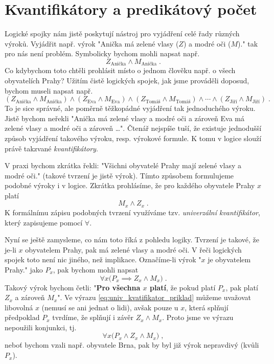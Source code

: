 \section{Kvantifikátory a predikátový počet}\label{sec:kvantifikatory_a_pred_pocet}

Logické spojky nám jistě poskytují nástroj pro vyjádření celé řady různých výroků. Vyjádřit např. výrok "Anička má zelené vlasy ($Z$) a modré oči ($M$)." tak pro nás není problém. Symbolicky bychom mohli napsat např.
\begin{equation*}
    Z_{\text{Anička}} \land M_{\text{Anička}}\; .
\end{equation*}
Co kdybychom toto chtěli prohlásit místo o jednom člověku např. o všech obyvatelích Prahy? Užitím čistě logických spojek, jak jsme prováděli doposud, bychom museli napsat např.
\begin{equation*}
    (Z_{\text{Anička}} \land M_{\text{Anička}}) \land (Z_{\text{Eva}} \land M_{\text{Eva}}) \land (Z_{\text{Tomáš}} \land M_{\text{Tomáš}}) \land \cdots \land (Z_{\text{Jiří}} \land M_{\text{Jiří}})\; .
\end{equation*}
To je sice správné, ale poměrně těžkopádné vyjádření tak jednoduchého výroku. Jistě bychom neřekli "Anička má zelené vlasy a modré oči a zároveň Eva má zelené vlasy a modré oči a zároveň \dots". Čtenář nejspíše tuší, že existuje jednodušší způsob vyjádření takového výroku, resp. výrokové formule. K tomu v logice slouží právě takzvané \emph{kvantifikátory}.\par
V praxi bychom zkrátka řekli: "Všichni obyvatelé Prahy mají zelené vlasy a modré oči." (takové tvrzení je jistě výrok). Tímto způsobem formulujeme podobné výroky i v logice. Zkrátka prohlásíme, že pro každého obyvatele Prahy $x$ platí
\begin{equation*}
    M_x \land Z_x\; .
\end{equation*}
K formálnímu zápisu podobných tvrzení využíváme tzv. \emph{univerzální kvantifikátor}, který zapisujeme pomocí $\forall$.\par
Nyní se ještě zamysleme, co nám toto říká z pohledu logiky. Tvrzení je takové, že je-li $x$ obyvatelem Prahy, pak má zelené vlasy a modré oči. V řeči logických spojek toto není nic jiného, než implikace. Označíme-li výrok "$x$ je obyvatelem Prahy." jako $P_x$, pak bychom mohli napsat
\begin{equation}\label{eq:univ_kvatifikator_priklad}
    \forall x \big(P_x \implies Z_x \land M_x\big)\; .
\end{equation}
Takový výrok bychom četli: "\textbf{Pro všechna $x$ platí}, že pokud platí $P_x$, pak platí $Z_x$ a zároveň $M_x$". Ve výrazu \eqref{eq:univ_kvatifikator_priklad} můžeme uvažovat libovolná $x$ (nemusí se ani jednat o lidi), avšak pouze u $x$, která splňují předpoklad $P_x$ tvrdíme, že splňují i závěr $Z_x \land M_x$. Proto jsme ve výrazu nepoužili konjunkci, tj.
\begin{equation*}
    \forall x \big(P_x \land Z_x \land M_x\big)\; ,
\end{equation*}
neboť bychom vzali např. obyvatele Brna, pak by byl již výrok nepravdivý (kvůli $P_x$).

